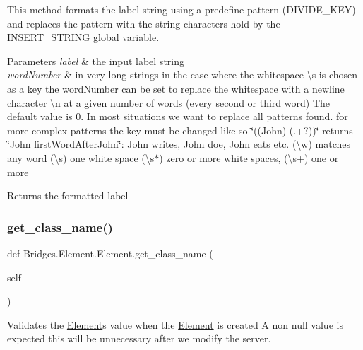 This method formats the label string using a predefine pattern (D\+I\+V\+I\+D\+E\+\_\+\+K\+EY) and replaces the pattern with the string characters hold by the I\+N\+S\+E\+R\+T\+\_\+\+S\+T\+R\+I\+NG global variable. 


\begin{DoxyParams}{Parameters}
{\em label} & the input label string\\
\hline
{\em word\+Number} & in very long strings in the case where the whitespace \textbackslash{}s is chosen as a key the word\+Number can be set to replace the whitespace with a newline character \textbackslash{}n at a given number of words (every second or third word) The default value is 0. In most situations we want to replace all patterns found. for more complex patterns the key must be changed like so \char`\"{}((\+John) (.+?))\char`\"{} returns \char`\"{}\+John first\+Word\+After\+John\char`\"{}\+: John writes, John doe, John eats etc. (\textbackslash{}w) matches any word (\textbackslash{}s) one white space (\textbackslash{}s$\ast$) zero or more white spaces, (\textbackslash{}s+) one or more\\
\hline
\end{DoxyParams}
\begin{DoxyReturn}{Returns}
the formatted label 
\end{DoxyReturn}
\mbox{\label{class_bridges_1_1_element_1_1_element_a8ac6ce7fef24e2f2dae3b7f56f079e4e}} 
\subsubsection{\texorpdfstring{get\+\_\+class\+\_\+name()}{get\_class\_name()}}
{\footnotesize\ttfamily def Bridges.\+Element.\+Element.\+get\+\_\+class\+\_\+name (\begin{DoxyParamCaption}\item[{}]{self }\end{DoxyParamCaption})}



Validates the \mbox{\hyperlink{class_bridges_1_1_element_1_1_element}{Element}}\textquotesingle{}s value when the \mbox{\hyperlink{class_bridges_1_1_element_1_1_element}{Element}} is created A non null value is expected this will be unnecessary after we modify the server. 


